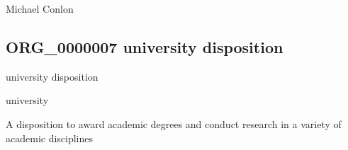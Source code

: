 \documentclass[letterpaper,10pt,english]{sphinxmanual}
\begin{document}
\begin{sphinxShadowBox}

\sphinxAtStartPar
Michael Conlon 
\end{sphinxShadowBox}
\begin{quote}

\ignorespaces \end{quote}


\subsection{ORG\_0000007 \sphinxhyphen{} university disposition}
\label{\detokenize{doc-ORG_0000007:org-0000007-university-disposition}}\label{\detokenize{doc-ORG_0000007:index-0}}\label{\detokenize{doc-ORG_0000007::doc}}
\begin{sphinxShadowBox}

\sphinxAtStartPar
university disposition
\end{sphinxShadowBox}

\begin{sphinxShadowBox}

\sphinxAtStartPar
university
\end{sphinxShadowBox}

\begin{sphinxShadowBox}

\sphinxAtStartPar
{\hyperref[\detokenize{doc-BFO_0000016::doc}]{}}
\end{sphinxShadowBox}

\begin{sphinxShadowBox}

\sphinxAtStartPar
A disposition to award academic degrees and conduct research in a variety of academic disciplines
\end{sphinxShadowBox}

\begin{sphinxShadowBox}

\sphinxAtStartPar
{}
\end{sphinxShadowBox}
\end{document}
